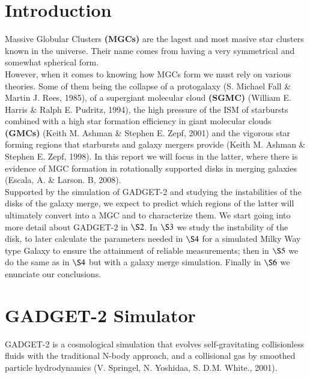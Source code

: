 \documentclass{aa}
\begin{document}
   \maketitle
%




\section{Introduction}

   
   Massive Globular Clusters \textbf{(MGCs)} are the lagest and most masive star clusters known in the universe. Their name comes from having a very symmetrical and somewhat spherical form.\\
   However, when it comes to knowing how MGCs form we must rely on various theories. Some of them being the collapse of a protogalaxy (S. Michael Fall \& Martin J. Rees, 1985), of a supergiant molecular cloud \textbf{(SGMC)} (William E. Harris \& Ralph E. Pudritz, 1994), the high pressure of the ISM of starbursts combined with a high star formation efficiency in giant molecular clouds \textbf{(GMCs)} (Keith M. Ashman \& Stephen E. Zepf, 2001) and the vigorous star forming regions that starbursts and galaxy mergers provide (Keith M. Ashman \& Stephen E. Zepf, 1998). In this report we will focus in the latter, where there is evidence of MGC formation in rotationally supported disks in merging galaxies (Escala, A. \& Larson. B, 2008).\\ Supported by the simulation of GADGET-2 and studying the instabilities of the disks of the galaxy merge, we expect to predict which regions of the latter will ultimately convert into a MGC and to characterize them. 
   We start going into more detail about GADGET-2 in $\S2$. In $\S3$ we study the instability of the disk, to later calculate the parameters needed in $\S4$ for a simulated Milky Way type Galaxy to ensure the attainment of reliable measurements; then in $\S5$  we do the same as in $\S4$ but with a galaxy merge simulation. Finally in $\S6$ we enunciate our conclusions.

\section{GADGET-2 Simulator}
   GADGET-2 is a cosmological simulation that evolves self-gravitating collisionless fluids with the traditional N-body approach, and a collisional gas by smoothed particle hydrodynamics (V. Springel, N. Yoshidaa, S. D.M. White., 2001). 
 
\end{document}
